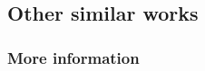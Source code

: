 \documentclass[../00_Main.tex]{subfiles}
\begin{document}
\subsection{Other similar works}


\subsubsection{More information}


\biblio %
\end{document}
